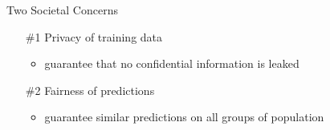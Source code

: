 \documentclass[17pt,aspectratio=169]{beamer}
\begin{document}
\begin{frame}[t]{Two Societal Concerns}
  \setlength\leftmarginii{0em}
  \begin{enumerate}
  \item[\#1] Privacy of training data
    \begin{itemize}
      \addtolength{\leftmarginii}{15ex}
    \item guarantee that no confidential information is leaked
    \end{itemize}

    \vspace{1em}

  \item[\#2] Fairness of predictions
    \begin{itemize}
    \item guarantee similar predictions on all groups of population
    \end{itemize}
  \end{enumerate}
\end{frame}
\end{document}
